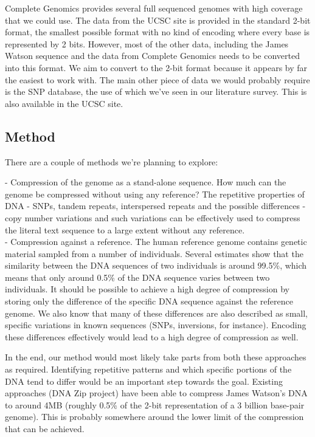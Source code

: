\documentclass{article}
\begin{document}
Complete Genomics \cite{completegenomics} provides several full sequenced genomes with high coverage that we could use. The data from the UCSC site is provided in the standard 2-bit format, the smallest possible format with no kind of encoding where every base is represented by 2 bits. However, most of the other data, including the James Watson sequence and the data from Complete Genomics needs to be converted into this format. We aim to convert to the 2-bit format because it appears by far the easiest to work with. The main other piece of data we would probably require is the SNP database, the use of which we've seen in our literature survey. This is also available in the UCSC site.

\subsection{Method}
There are a couple of methods we're planning to explore:

- Compression of the genome as a stand-alone sequence. How much can the genome be compressed without using any reference? The repetitive properties of DNA - SNPs, tandem repeats, interspersed repeats and the possible differences - copy number variations and such variations can be effectively used to compress the literal text sequence to a large extent without any reference.\\
- Compression against a reference. The human reference genome contains genetic material sampled from a number of individuals. Several estimates show that the similarity between the DNA sequences of two individuals is around 99.5\%, which means that only around 0.5\% of the DNA sequence varies between two individuals. It should be possible to achieve a high degree of compression by storing only the difference of the specific DNA sequence against the reference genome. We also know that many of these differences are also described as small, specific variations in known sequences (SNPs, inversions, for instance). Encoding these differences effectively would lead to a high degree of compression as well.

In the end, our method would most likely take parts from both these approaches as required. Identifying repetitive patterns and which specific portions of the DNA tend to differ would be an important step towards the goal. Existing approaches (DNA Zip project) \cite{dnazip,dnazip_paper} have been able to compress James Watson's DNA to around 4MB (roughly 0.5\% of the 2-bit representation of a 3 billion base-pair genome). This is probably somewhere around the lower limit of the compression that can be achieved.
\clearpage
\end{document}
